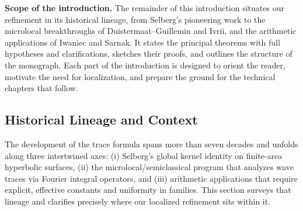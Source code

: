 \medskip

\noindent\textbf{Scope of the introduction.}
The remainder of this introduction situates our refinement in its historical
lineage, from Selberg’s pioneering work to the microlocal breakthroughs of
Duistermaat–Guillemin and Ivrii, and the arithmetic applications of Iwaniec and
Sarnak. It states the principal theorems with full hypotheses and clarifications,
sketches their proofs, and outlines the structure of the monograph. Each part of
the introduction is designed to orient the reader, motivate the need for
localization, and prepare the ground for the technical chapters that follow.


\subsection*{Historical Lineage and Context}

The development of the trace formula spans more than seven decades and unfolds along
three intertwined axes: (i) Selberg’s global kernel identity on finite-area hyperbolic
surfaces, (ii) the microlocal/semiclassical program that analyzes wave traces via
Fourier integral operators, and (iii) arithmetic applications that require explicit,
effective constants and uniformity in families. This section surveys that lineage and
clarifies precisely where our localized refinement sits within it.

